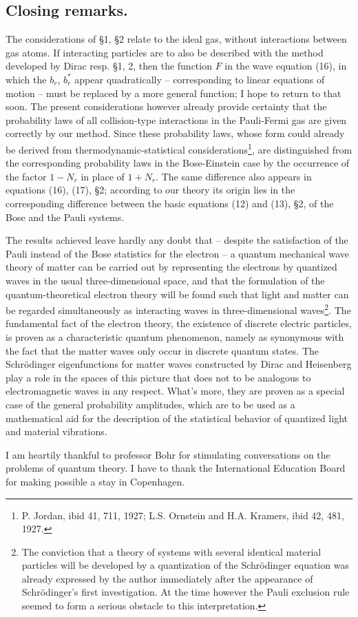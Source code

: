 \begin{paper}{1}
\section{Closing remarks.} The considerations of \S1, \S2 relate to the ideal gas, without interactions between gas atoms. If interacting particles are to also be described with the method developed by Dirac resp. \S1, 2, then the function $F$ in the wave equation (16), in which the $b_r$, $b_r^*$ appear quadratically -- corresponding to linear equations of motion -- must be replaced by a more general function; I hope to return to that soon. The present considerations however already provide certainty that the probability laws of all collision-type interactions in the Pauli-Fermi gas are given correctly by our method. Since these probability laws, whose form could already be derived from thermodynamic-statistical considerations\footnote{P. Jordan, ibid 41, 711, 1927; L.S. Ornstein and H.A. Kramers, ibid 42, 481, 1927.}, are distinguished from the corresponding probability laws in the Bose-Einstein case by the occurrence of the factor $1-N_r$ in place of $1+N_r$. The same difference also appears in equations (16), (17), \S2; according to our theory its origin lies in the corresponding difference between the basic equations (12) and (13), \S2, of the Bose and the Pauli systems.

The results achieved leave hardly any doubt that -- despite the satisfaction of the Pauli instead of the Bose statistics for the electron -- a quantum mechanical wave theory of matter can be carried out by representing the electrons by quantized waves in the usual three-dimensional space, and that the  formulation of the quantum-theoretical electron theory will be found such that light and matter can be regarded simultaneously as interacting waves in three-dimensional waves\footnote{The conviction that a theory of systems with several identical material particles will be developed by a quantization of the Schrödinger equation was already expressed by the author immediately after the appearance of Schrödinger's first investigation. At the time however the Pauli exclusion rule seemed to form a serious obstacle to this interpretation.}. The fundamental fact of the electron theory, the existence of discrete electric particles, is proven as a characteristic quantum phenomenon, namely as synonymous with the fact that the matter waves only occur in discrete quantum states. The Schrödinger eigenfunctions for matter waves constructed by Dirac and Heisenberg play a role in the spaces of this picture that does not to be analogous to electromagnetic waves in any respect. What's more, they are proven as a special case of the general probability amplitudes, which are to be used as a mathematical aid for the description of the statistical behavior of quantized light and material vibrations.

I am heartily thankful to professor Bohr for stimulating conversations on the problems of quantum theory. I have to thank the International Education Board for making possible a stay in Copenhagen.
\end{paper}